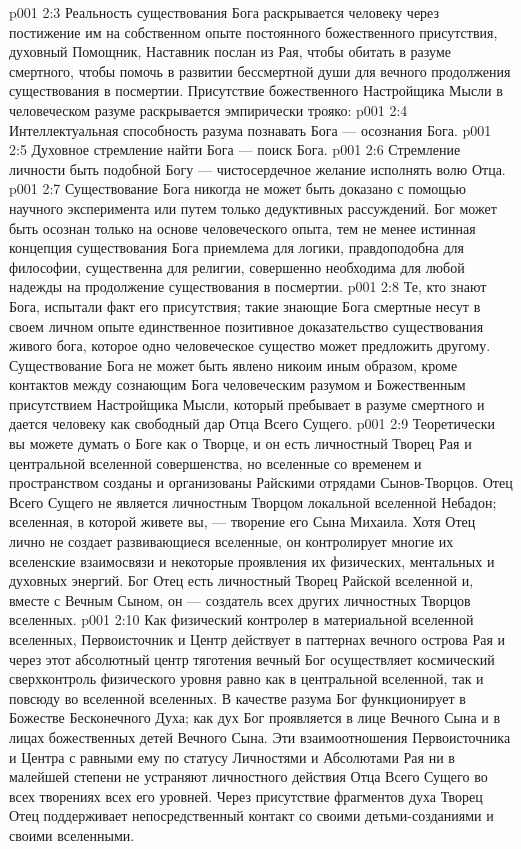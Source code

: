 \vs p001 2:3 \pc Реальность существования Бога раскрывается человеку через постижение им на собственном опыте постоянного божественного присутствия, духовный Помощник, Наставник послан из Рая, чтобы обитать в разуме смертного, чтобы помочь в развитии бессмертной души для вечного продолжения существования в посмертии. Присутствие божественного Настройщика Мысли в человеческом разуме раскрывается эмпирически трояко:
\vs p001 2:4 \bibnobreakspace Интеллектуальная способность разума познавать Бога --- осознания Бога.
\vs p001 2:5 \bibnobreakspace Духовное стремление найти Бога --- поиск Бога.
\vs p001 2:6 \bibnobreakspace Стремление личности быть подобной Богу --- чистосердечное желание исполнять волю Отца.
\vs p001 2:7 \pc Существование Бога никогда не может быть доказано с помощью научного эксперимента или путем только дедуктивных рассуждений. Бог может быть осознан только на основе человеческого опыта, тем не менее истинная концепция существования Бога приемлема для логики, правдоподобна для философии, существенна для религии, совершенно необходима для любой надежды на продолжение существования в посмертии.
\vs p001 2:8 Те, кто знают Бога, испытали факт его присутствия; такие знающие Бога смертные несут в своем личном опыте единственное позитивное доказательство существования живого бога, которое одно человеческое существо может предложить другому. Существование Бога не может быть явлено никоим иным образом, кроме контактов между сознающим Бога человеческим разумом и Божественным присутствием Настройщика Мысли, который пребывает в разуме смертного и дается человеку как свободный дар Отца Всего Сущего.
\vs p001 2:9 \pc Теоретически вы можете думать о Боге как о Творце, и он есть личностный Творец Рая и центральной вселенной совершенства, но вселенные со временем и пространством созданы и организованы Райскими отрядами Сынов\hyp{}Творцов. Отец Всего Сущего не является личностным Творцом локальной вселенной Небадон; вселенная, в которой живете вы, --- творение его Сына Михаила. Хотя Отец лично не создает развивающиеся вселенные, он контролирует многие их вселенские взаимосвязи и некоторые проявления их физических, ментальных и духовных энергий. Бог Отец есть личностный Творец Райской вселенной и, вместе с Вечным Сыном, он --- создатель всех других личностных Творцов вселенных.
\vs p001 2:10 \pc Как физический контролер в материальной вселенной вселенных, Первоисточник и Центр действует в паттернах вечного острова Рая и через этот абсолютный центр тяготения вечный Бог осуществляет космический сверхконтроль физического уровня равно как в центральной вселенной, так и повсюду во вселенной вселенных. В качестве разума Бог функционирует в Божестве Бесконечного Духа; как дух Бог проявляется в лице Вечного Сына и в лицах божественных детей Вечного Сына. Эти взаимоотношения Первоисточника и Центра с равными ему по статусу Личностями и Абсолютами Рая ни в малейшей степени не устраняют  личностного действия Отца Всего Сущего во всех творениях всех его уровней. Через присутствие фрагментов духа Творец Отец поддерживает непосредственный контакт со своими детьми\hyp{}созданиями и своими вселенными.
